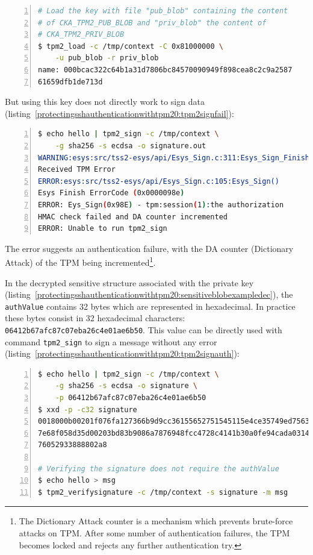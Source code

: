 \begin{lstlisting}[language=sh, numbers=left, caption={Loading private key blob and public key blob in the TPM}, label=protectingsshauthenticationwithtpm20:tpm2loadpriv]
# Load the key with file "pub_blob" containing the content
# of CKA_TPM2_PUB_BLOB and "priv_blob" the content of
# CKA_TPM2_PRIV_BLOB
$ tpm2_load -c /tmp/context -C 0x81000000 \
    -u pub_blob -r priv_blob
name: 000bcac322c64b1a31d7806bc84570090949f898cea8c2c9a2587
61659dfb1de713d
\end{lstlisting}

But using this key does not directly work to sign data
(listing~\ref{protectingsshauthenticationwithtpm20:tpm2signfail}):

\begin{lstlisting}[language=sh, numbers=left, caption={Trying to use the key to sign a message produces errors}, label=protectingsshauthenticationwithtpm20:tpm2signfail]
$ echo hello | tpm2_sign -c /tmp/context \
    -g sha256 -s ecdsa -o signature.out
WARNING:esys:src/tss2-esys/api/Esys_Sign.c:311:Esys_Sign_Finish()
Received TPM Error
ERROR:esys:src/tss2-esys/api/Esys_Sign.c:105:Esys_Sign()
Esys Finish ErrorCode (0x0000098e)
ERROR: Eys_Sign(0x98E) - tpm:session(1):the authorization
HMAC check failed and DA counter incremented
ERROR: Unable to run tpm2_sign
\end{lstlisting}

The error suggests an authentication failure, with the DA counter
(Dictionary Attack) of the TPM being incremented\footnote{The Dictionary
  Attack counter is a mechanism which prevents brute-force attacks on
  TPM. After some number of authentication failures, the TPM becomes
  locked and rejects any further authentication try.}.

In the decrypted sensitive structure associated with the private key
(listing~\ref{protectingsshauthenticationwithtpm20:sensitiveblobexampledec}),
the \texttt{authValue} contains 32 bytes which are
represented in hexadecimal. In practice these bytes consist in 32
hexadecimal characters:
\texttt{06412b67afc87c07eba26c4e01ae6b50}. This value
can be directly used with command \texttt{tpm2\_sign}
to sign a message without any error
(listing~\ref{protectingsshauthenticationwithtpm20:tpm2signauth}):

\begin{lstlisting}[language=sh, numbers=left, caption={Trying to use the key to sign a message with the \texttt{authValue} (parameter \texttt{-p} succeeds}, label=protectingsshauthenticationwithtpm20:tpm2signauth]
$ echo hello | tpm2_sign -c /tmp/context \
    -g sha256 -s ecdsa -o signature \
    -p 06412b67afc87c07eba26c4e01ae6b50
$ xxd -p -c32 signature
0018000b00201f076fa127366b9d9cc36155652751545115e4ce35749ed75638
7e68f058d35d00203bd83b9086a7876948fcc4728c4141b30a0fe94cada03147
76052933888802a8

# Verifying the signature does not require the authValue
$ echo hello > msg
$ tpm2_verifysignature -c /tmp/context -s signature -m msg
\end{lstlisting}

